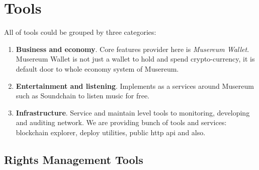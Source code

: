 \documentclass[12pt]{report}
\newcommand{\hlc}[1]{\colorbox{yellow!25}{#1}}
\begin{document}
\section{\hlc{Tools}}
\label{platform-tools}
\begin{multicols}{2}
All of tools could be grouped by three categories:
\begin{enumerate}
	\item \textbf{Business and economy}. Core features provider here is \textit{Musereum Wallet}. Musereum Wallet is not just a wallet to hold and spend crypto-currency, it is default door to whole economy system of Musereum. 
	\item \textbf{Entertainment and listening}. Implements as a services around Musereum such as Soundchain to listen music for free.
	\item \textbf{Infrastructure}. Service and maintain level tools to monitoring, developing and auditing network. We are providing bunch of tools and services: blockchain explorer, deploy utilities, public http api and also.
\end{enumerate}
\end{multicols}

\subsection{\hlc{Rights Management Tools}}
\label{platform-tools-rights}


\def\Registration{Person Registration (Author)}
\def\RegistrationMusereum{Create ETM Wallet}
\def\KYC{KYC (Proof of Identity)}
\def\CreateAsset{Create Asset}
\def\AssetTitle{Title}
\def\AssetImage{Image}
\def\AssetRelease{Release Date}
\def\AssetLanguage{Language}
\def\AssetBPM{BPM}
\def\AssetTempo{Tempo}
\def\AssetVocal{Vocal}
\def\AssetMusicalKey{Musical Key}
\def\AssetKeywords{Keywords}
\def\AssetMoods{Moods}
\def\AssetSimilar{Similar assets}
\def\AssetDescription{Description}
\def\AssetGenres{Genres}

\def\AssetRegistration{Create Asset Record}
\def\Registrator{Affilated Registrators}
\def\RegistrationBallot{Registration Ballot}
\def\AddAsset{Add Asset to Catalog}
\def\CreateDAL{Create Asset DAL}

\def\SetupDAL{Initial DAL Configuration}
\def\TokenSetup{DAL Token Setup}
\def\VotingSetup{DAL Voting Setup}
\end{document}
